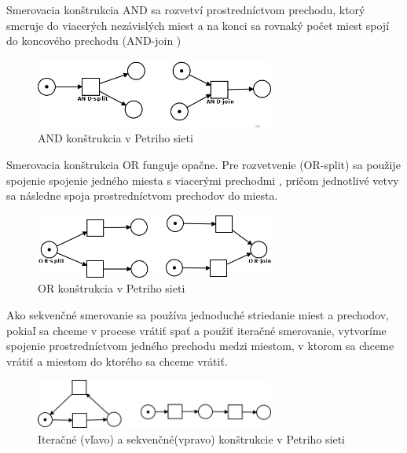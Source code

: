 Smerovacia konštrukcia AND sa rozvetví prostredníctvom prechodu, ktorý smeruje do viacerých nezávislých miest a na konci sa rovnaký počet miest spojí do koncového prechodu (AND-join )
\begin{figure}[h]
	\centerline{\includegraphics[width=0.7\textwidth]{images/and}}
	\caption[and]{AND konštrukcia v Petriho sieti}
	\label{obr:cursus}
\end{figure}

Smerovacia konštrukcia OR funguje opačne. Pre rozvetvenie (OR-split) sa použije spojenie spojenie jedného miesta s viacerými prechodmi , pričom jednotlivé vetvy sa následne spoja prostredníctvom prechodov do miesta.
\begin{figure}[h]
	\centerline{\includegraphics[width=0.7\textwidth]{images/or}}
	\caption[or]{OR konštrukcia v Petriho sieti}
	\label{obr:cursus}
\end{figure}

Ako sekvenčné smerovanie sa používa jednoduché striedanie miest a prechodov, pokiaľ sa chceme v procese vrátiť spať a použiť iteračné smerovanie, vytvoríme spojenie prostredníctvom jedného prechodu medzi miestom, v ktorom sa chceme vrátiť a miestom do ktorého sa chceme vrátiť. 
\begin{figure}[h]
	\centerline{\includegraphics[width=0.7\textwidth]{images/iteracia}}
	\caption[sekvencne a iteračné]{Iteračné (vľavo) a sekvenčné(vpravo) konštrukcie v Petriho sieti}
	\label{obr:cursus}
\end{figure}



